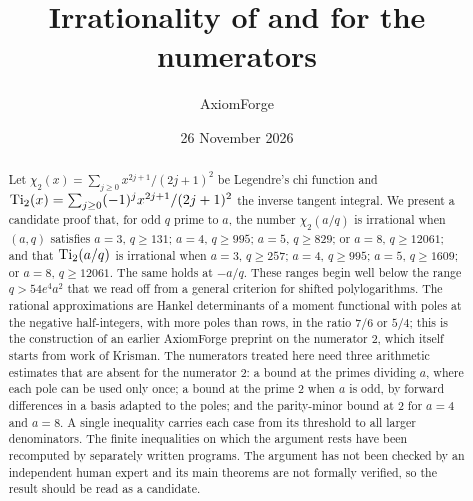 \documentclass[11pt]{amsart}
\title[Irrationality of chi and Ti at the numerators 3, 4, 5, 8]%
{\texorpdfstring{Irrationality of \titlechi{} and \titleti{} for the numerators \titlea}%
{Irrationality of chi2(a/q) and Ti2(a/q) for the numerators a = 3, 4, 5, 8}}
\author{AxiomForge}
\date{26 November 2026}
\begin{document}
\begin{abstract}
Let $\chi_2(x)=\sum_{j\ge0}x^{2j+1}/(2j+1)^2$ be Legendre's chi function and
$\operatorname{Ti}_2(x)=\sum_{j\ge0}(-1)^jx^{2j+1}/(2j+1)^2$ the inverse tangent integral. We present a
candidate proof that, for odd $q$ prime to $a$, the number $\chi_2(a/q)$ is irrational when
$(a,q)$ satisfies $a=3$, $q\ge131$; $a=4$, $q\ge995$; $a=5$, $q\ge829$; or $a=8$, $q\ge12061$;
and that $\operatorname{Ti}_2(a/q)$ is irrational when $a=3$, $q\ge257$; $a=4$, $q\ge995$; $a=5$,
$q\ge1609$; or $a=8$, $q\ge12061$. The same holds at $-a/q$. These ranges begin well below
the range $q>54e^4a^2$ that we read off from a general criterion for shifted polylogarithms. The
rational approximations are Hankel determinants of a moment functional with poles at the
negative half-integers, with more poles than rows, in the ratio $7/6$ or $5/4$; this is the
construction of an earlier AxiomForge preprint on the numerator $2$, which itself starts from
work of Krisman. The numerators treated here need three arithmetic estimates that are absent
for the numerator $2$: a bound at the primes dividing $a$, where each pole can be used only
once; a bound at the prime $2$ when $a$ is odd, by forward differences in a basis adapted to
the poles; and the parity-minor bound at $2$ for $a=4$ and $a=8$. A single inequality carries
each case from its threshold to all larger denominators. The finite inequalities on which the
argument rests have been recomputed by separately written programs. The argument has not been
checked by an independent human expert and its main theorems are not formally verified, so the
result should be read as a candidate.
\end{abstract}

\affrontmatter











\appendix



\clearpage



\clearpage


\end{document}
